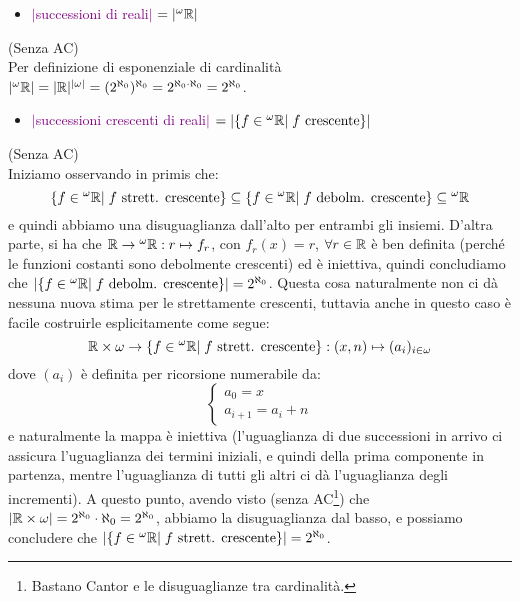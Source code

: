 \begin{itemize}
	\item \textcolor{purple}{$|$successioni di reali$|$ $= |{}^\omega \mathbb R|$}
\end{itemize}

\begin{soln}
	(Senza AC)\\
	Per definizione di esponenziale di cardinalità $|{}^\omega \mathbb R| = |\mathbb R|^{|\omega|} = (2^{\aleph_0})^{\aleph_0} = 2^{\aleph_0 \cdot \aleph_0} = 2^{\aleph_0}$.
\end{soln}

\begin{itemize}
	\item \textcolor{purple}{$|$successioni crescenti di reali$|$ $= |\{f \in {}^\omega \mathbb R | \; \text{$f$ crescente}\}|$}
\end{itemize}

\begin{soln}
	(Senza AC)\\
	Iniziamo osservando in primis che:
	\[ \{f \in {}^{\omega}\mathbb R | \; \text{$f$ strett. crescente}\} \subseteq \{f \in {}^{\omega}\mathbb R | \; \text{$f$ debolm. crescente}\} \subseteq {}^{\omega}\mathbb R
		\]
	e quindi abbiamo una disuguaglianza dall'alto per entrambi gli insiemi. D'altra parte, si ha che $\mathbb R \to {}^{\omega}\mathbb R : r \mapsto f_r$, con $f_r(x) = r$, $\forall r \in \mathbb R$ è ben definita (perché le funzioni costanti sono debolmente crescenti) ed è iniettiva, quindi concludiamo che 
	$|\{f \in {}^{\omega}\mathbb R | \; \text{$f$ debolm. crescente}\}| = 2^{\aleph_0}$. Questa cosa naturalmente non ci dà nessuna nuova stima per le strettamente crescenti, tuttavia anche in questo caso è facile costruirle esplicitamente come segue:
	\[ \mathbb R \times \omega \to \{f \in {}^{\omega}\mathbb R | \; \text{$f$ strett. crescente}\} : (x,n) \mapsto (a_i)_{i \in \omega}
		\]
	dove $(a_i)$ è definita per ricorsione numerabile da:
	\[ \begin{cases}
		a_0 = x \\
		a_{i+1} = a_i + n
	\end{cases}
		\]
	e naturalmente la mappa è iniettiva (l'uguaglianza di due successioni in arrivo ci assicura l'uguaglianza dei termini iniziali, e quindi della prima componente in partenza, mentre l'uguaglianza di tutti gli altri ci dà l'uguaglianza degli incrementi). A questo punto, avendo visto (senza AC\footnote{Bastano Cantor e le disuguaglianze tra cardinalità.}) che $|\mathbb R \times \omega| = 2^{\aleph_0} \cdot \aleph_0 = 2^{\aleph_0}$,
	abbiamo la disuguaglianza dal basso, e possiamo concludere che $|\{f \in {}^{\omega}\mathbb R | \; \text{$f$ strett. crescente}\}| = 2^{\aleph_0}$.
\end{soln}


